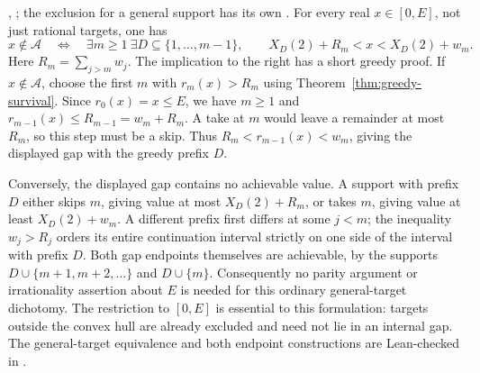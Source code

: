 \begin{obs}
,
;
the exclusion for a general support has its own
.
\label{obs:general-target-gap}
For every real $x\in[0,E]$, not just rational targets, one has
\[
 x\notin\mathcal A\quad\Longleftrightarrow\quad
 \exists m\ge1\ \exists D\subseteq\{1,\ldots,m-1\},\qquad
 X_D(2)+R_m<x<X_D(2)+w_m.
\]
Here $R_m=\sum_{j>m}w_j$.  The implication to the right has a
short greedy proof.  If $x\notin\mathcal A$, choose the first $m$
with $r_m(x)>R_m$ using Theorem~\ref{thm:greedy-survival}.
Since $r_0(x)=x\le E$, we have $m\ge1$ and
$r_{m-1}(x)\le R_{m-1}=w_m+R_m$.  A take at $m$ would leave a
remainder at most $R_m$, so this step must be a skip.  Thus
$R_m<r_{m-1}(x)<w_m$, giving the displayed gap with the greedy
prefix $D$.

Conversely, the displayed gap contains no achievable value.
A support with prefix $D$ either skips $m$, giving value at most
$X_D(2)+R_m$, or takes $m$, giving value at least $X_D(2)+w_m$.
A different prefix first differs at some $j<m$; the inequality
$w_j>R_j$ orders its entire continuation interval strictly on one
side of the interval with prefix $D$.
Both gap endpoints themselves are achievable, by the supports
$D\cup\{m+1,m+2,\ldots\}$ and $D\cup\{m\}$.
Consequently no parity argument or irrationality assertion about
$E$ is needed for this ordinary general-target dichotomy.
The restriction to $[0,E]$ is essential to this formulation:
targets outside the convex hull are already excluded and need not
lie in an internal gap.  The general-target equivalence and both endpoint
constructions are Lean-checked in
.
\end{obs}

